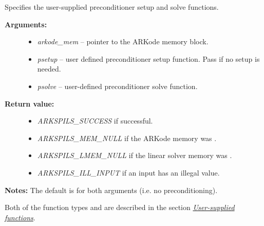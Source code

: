 \documentclass[letterpaper,10pt,english]{sphinxmanual}
\begin{document}
\begin{fulllineitems}
\label{c_interface/User_callable:ARKSpilsSetPreconditioner}
Specifies the user-supplied preconditioner setup and solve functions.
\begin{description}
\item[{\textbf{Arguments:}}] \leavevmode\begin{itemize}
\item {} 
\emph{arkode\_mem} -- pointer to the ARKode memory block.

\item {} 
\emph{psetup} -- user defined preconditioner setup function.  Pass
 if no setup is needed.

\item {} 
\emph{psolve} -- user-defined preconditioner solve function.

\end{itemize}

\item[{\textbf{Return value:}}] \leavevmode\begin{itemize}
\item {} 
\emph{ARKSPILS\_SUCCESS} if successful.

\item {} 
\emph{ARKSPILS\_MEM\_NULL} if the ARKode memory was .

\item {} 
\emph{ARKSPILS\_LMEM\_NULL} if the linear solver memory was .

\item {} 
\emph{ARKSPILS\_ILL\_INPUT} if an input has an illegal value.

\end{itemize}

\end{description}

\textbf{Notes:} The default is  for both arguments (i.e. no
preconditioning).

Both of the function types {\hyperref[c_interface/User_supplied:ARKSpilsPrecSetupFn]{}} and
{\hyperref[c_interface/User_supplied:ARKSpilsPrecSolveFn]{}} are described in the section
{\hyperref[c_interface/User_supplied:cinterface-usersupplied]{\emph{User-supplied functions}}}.

\end{fulllineitems}
\end{document}
